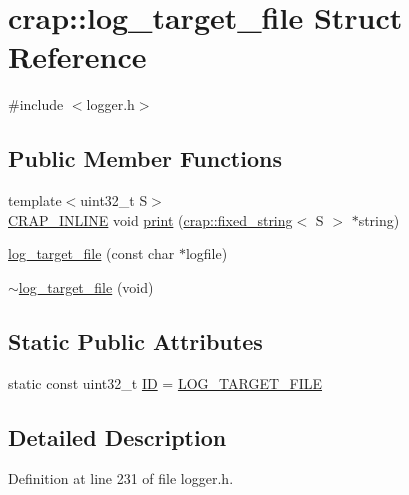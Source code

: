 \hypertarget{structcrap_1_1log__target__file}{\section{crap\+:\+:log\+\_\+target\+\_\+file Struct Reference}
\label{structcrap_1_1log__target__file}
}


{\ttfamily \#include $<$logger.\+h$>$}

\subsection*{Public Member Functions}
\begin{DoxyCompactItemize}
\item 
{\footnotesize template$<$uint32\+\_\+t S$>$ }\\\hyperlink{config__x86_8h_a5a40526b8d842e7ff731509998bb0f1c}{C\+R\+A\+P\+\_\+\+I\+N\+L\+I\+N\+E} void \hyperlink{structcrap_1_1log__target__file_ab553b7699a39201299d55fcc33ce7f39}{print} (\hyperlink{classcrap_1_1fixed__string}{crap\+::fixed\+\_\+string}$<$ S $>$ $\ast$string)
\item 
\hyperlink{structcrap_1_1log__target__file_aa70a9e95eeecffe90641c999a9fd83dd}{log\+\_\+target\+\_\+file} (const char $\ast$logfile)
\item 
\hyperlink{structcrap_1_1log__target__file_a6169a101af6d3dfa3ea5cf15198cad5d}{$\sim$log\+\_\+target\+\_\+file} (void)
\end{DoxyCompactItemize}
\subsection*{Static Public Attributes}
\begin{DoxyCompactItemize}
\item 
static const uint32\+\_\+t \hyperlink{structcrap_1_1log__target__file_acf3fecd666f8318bbd09d33ca0531803}{I\+D} = \hyperlink{logger_8h_a15b53599af6891ab8add65cc94e2acb7}{L\+O\+G\+\_\+\+T\+A\+R\+G\+E\+T\+\_\+\+F\+I\+L\+E}
\end{DoxyCompactItemize}


\subsection{Detailed Description}


Definition at line 231 of file logger.\+h.



